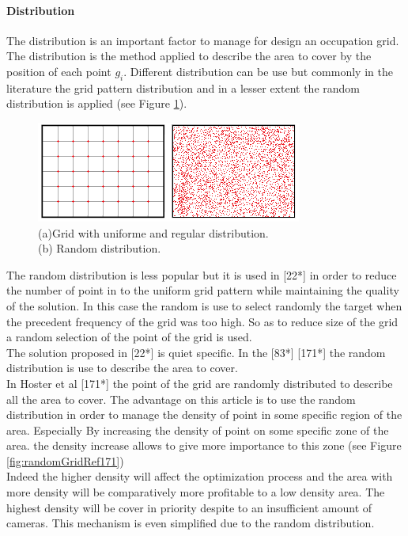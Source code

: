 \paragraph*{ Distribution}
The distribution is an important factor to manage for design an occupation grid. The distribution is the method applied to describe the area to cover by the position of each point $g_i$.
Different distribution can be use but commonly in the literature the grid pattern distribution and in a lesser extent the random distribution is applied (see Figure \ref{fig:GridVsRand}). \\
\begin{figure}[t!]
   \includegraphics[width=\linewidth]{img/GridVsRand.png}
  \caption{ (a)Grid with uniforme and regular distribution.\\   
(b) Random distribution.\\  
}\label{fig:GridVsRand}
  \endminipage\hfill
\end{figure}
The random distribution is less popular but it is used in [22*] in order to reduce the number of point in to the uniform grid pattern while maintaining the quality of the solution. In this case the random is use to select randomly the target when the precedent frequency of the grid was too high. So as to reduce size of the grid a random selection of the point of the grid is used. \\
The solution proposed in [22*] is quiet specific. In the [83*] [171*] the random distribution is use to describe the area to cover. \\
In Hoster et al [171*] the point of the grid are randomly distributed to describe all the area to cover. The advantage on this article is to use the random distribution in order to  manage the density of point in some specific region of the area. Especially By increasing the density of point on some specific zone of the area. the density increase allows to give more importance to this zone (see Figure \ref{fig:randomGridRef171})\\
Indeed the higher density will affect the optimization process and the area with more density will be comparatively  more profitable to a low density area. The highest density will be cover in priority despite to an insufficient amount of cameras. This mechanism is even simplified due to the random distribution.

